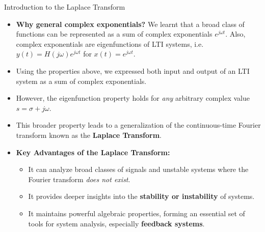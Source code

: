 \begin{frame}{Introduction to the Laplace Transform}
    \begin{itemize}
        \item \textbf{Why general complex exponentials?}
              We learnt that a broad class of functions can be represented as a sum of complex exponentials $e^{j\omega t}$.
              Also, complex exponentials are eigenfunctions of LTI systems, i.e. $y(t) = H(j\omega)e^{j\omega t}$ for $x(t) = e^{j\omega t}$.
        \item Using the properties above, we expressed both input and output of an LTI system as a sum of complex exponentials.
        \item However, the eigenfunction property holds for \textit{any} arbitrary complex value $s = \sigma + j\omega$.
        \item This broader property leads to a generalization of the continuous-time Fourier transform known as the \textbf{Laplace Transform}.
        \item \textbf{Key Advantages of the Laplace Transform:}
              \begin{itemize}
                  \item It can analyze broad classes of signals and unstable systems where the Fourier transform \textit{does not exist}.
                  \item It provides deeper insights into the \textbf{stability or instability} of systems.
                  \item It maintains powerful algebraic properties, forming an essential set of tools for system analysis, especially \textbf{feedback systems}.
              \end{itemize}
    \end{itemize}
\end{frame}

